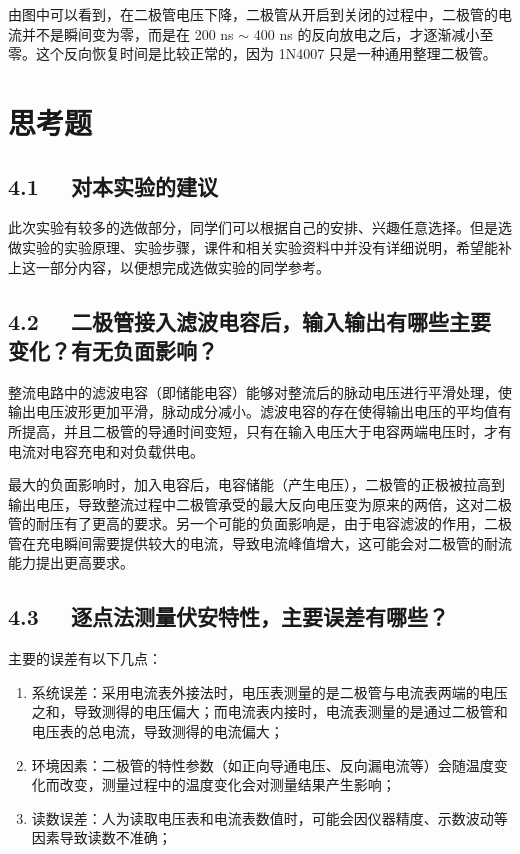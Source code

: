 \documentclass[UTF8]{article}
\begin{document}
由图中可以看到，在二极管电压下降，二极管从开启到关闭的过程中，二极管的电流并不是瞬间变为零，而是在 200 ns $\sim$ 400 ns 的反向放电之后，才逐渐减小至零。这个反向恢复时间是比较正常的，因为 1N4007 只是一种通用整理二极管。

\section{思考题}

\subsection*{4.1 \ \ 对本实验的建议}

此次实验有较多的选做部分，同学们可以根据自己的安排、兴趣任意选择。但是选做实验的实验原理、实验步骤，课件和相关实验资料中并没有详细说明，希望能补上这一部分内容，以便想完成选做实验的同学参考。

\subsection*{4.2 \ \ 二极管接入滤波电容后，输入输出有哪些主要变化？有无负面影响？}

整流电路中的滤波电容（即储能电容）能够对整流后的脉动电压进行平滑处理，使输出电压波形更加平滑，脉动成分减小。滤波电容的存在使得输出电压的平均值有所提高，并且二极管的导通时间变短，只有在输入电压大于电容两端电压时，才有电流对电容充电和对负载供电。

最大的负面影响时，加入电容后，电容储能（产生电压），二极管的正极被拉高到输出电压，导致整流过程中二极管承受的最大反向电压变为原来的两倍，这对二极管的耐压有了更高的要求。另一个可能的负面影响是，由于电容滤波的作用，二极管在充电瞬间需要提供较大的电流，导致电流峰值增大，这可能会对二极管的耐流能力提出更高要求。

\subsection*{4.3 \ \ 逐点法测量伏安特性，主要误差有哪些？}

\noindent 主要的误差有以下几点：
\begin{enumerate}
\item 系统误差：采用电流表外接法时，电压表测量的是二极管与电流表两端的电压之和，导致测得的电压偏大；而电流表内接时，电流表测量的是通过二极管和电压表的总电流，导致测得的电流偏大；
\item 环境因素：二极管的特性参数（如正向导通电压、反向漏电流等）会随温度变化而改变，测量过程中的温度变化会对测量结果产生影响；
\item 读数误差：人为读取电压表和电流表数值时，可能会因仪器精度、示数波动等因素导致读数不准确；
\end{enumerate}
\end{document}
